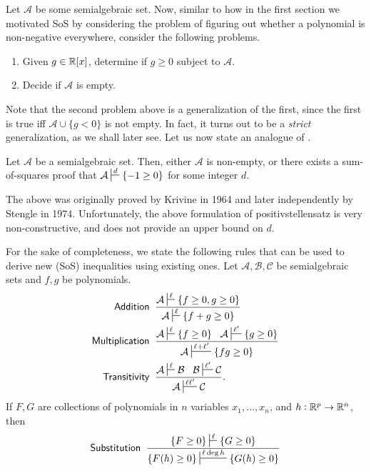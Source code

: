 Let $\mathcal{A}$ be some semialgebraic set. Now, similar to how in the first section we motivated SoS by considering the problem of figuring out whether a polynomial is non-negative everywhere, consider the following problems.

\begin{enumerate}
	\item Given $g \in \mathbb{R}[x]$, determine if $g \ge 0$ subject to $\mathcal{A}$.
	\item Decide if $\mathcal{A}$ is empty.
\end{enumerate}

Note that the second problem above is a generalization of the first, since the first is true iff $\mathcal{A} \cup \{g < 0\}$ is not empty. In fact, it turns out to be a \emph{strict} generalization, as we shall later see. Let us now state an analogue of .

\begin{flem}[Positivstellensatz]
	\label{positivstellensatz}
	Let $\mathcal{A}$ be a semialgebraic set. Then, either $\mathcal{A}$ is non-empty, or there exists a sum-of-squares proof that $\mathcal{A} \sststile{}{d} \{-1 \ge 0\}$ for some integer $d$.
\end{flem}

The above was originally proved by Krivine \cite{krivine-positivstellensatz} in 1964 and later independently by Stengle \cite{stengle-positivstellensatz} in 1974. Unfortunately, the above formulation of positivstellensatz is very non-constructive, and does not provide an upper bound on $d$.

For the sake of completeness, we state the following rules that can be used to derive new (SoS) inequalities using existing ones. Let $\mathcal{A},\mathcal{B},\mathcal{C}$ be semialgebraic sets and $f,g$ be polynomials. 
\begin{align*}
	\mathsf{Addition} &\;\; \frac{\mathcal{A} \sststile{}{\ell} \{f \ge 0, g \ge 0\}}{\mathcal{A} \sststile{}{\ell} \{f+g \ge 0\}} \\
	\mathsf{Multiplication} &\;\; \frac{\mathcal{A} \sststile{}{\ell} \{f \ge 0\} \; \; \; \mathcal{A} \sststile{}{\ell'} \{g \ge 0\}}{\mathcal{A} \sststile{}{\ell+\ell'} \{fg \ge 0\}} \\
	\mathsf{Transitivity} &\;\; \frac{\mathcal{A} \sststile{}{\ell} \mathcal{B} \; \; \; \mathcal{B} \sststile{}{\ell'} \mathcal{C}}{\mathcal{A} \sststile{}{\ell\ell'} \mathcal{C}}.
\end{align*}
If $F,G$ are collections of polynomials in $n$ variables $x_1,\ldots,x_n$, and $h : \mathbb{R}^p \to \mathbb{R}^n$, then
\[ \mathsf{Substitution} \;\; \frac{\{F \ge 0\} \sststile{}{\ell} \{G \ge 0\}}{\{F(h) \ge 0\} \sststile{}{\ell \deg h} \{G(h) \ge 0\}} \]

